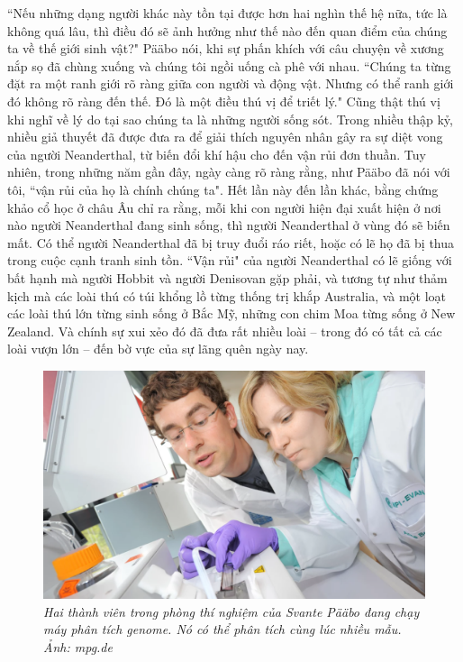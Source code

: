 \begin{multicols}{2}
	\vskip 0.1cm
	``Nếu những dạng người khác này tồn tại được hơn hai nghìn thế hệ nữa, tức là không quá lâu, thì điều đó sẽ ảnh hưởng như thế nào đến quan điểm của chúng ta về thế giới sinh vật?" Pääbo nói, khi sự phấn khích với câu chuyện về xương nắp sọ đã chùng xuống và chúng tôi ngồi uống cà phê với nhau. ``Chúng ta từng đặt ra một ranh giới rõ ràng giữa con người và động vật. Nhưng có thể ranh giới đó không rõ ràng đến thế. Đó là một điều thú vị để triết lý." Cũng thật thú vị khi nghĩ về lý do tại sao chúng ta là những người sống sót.
	\vskip 0.1cm
	Trong nhiều thập kỷ, nhiều giả thuyết đã được đưa ra để giải thích nguyên nhân gây ra sự diệt vong của người Neanderthal, từ biến đổi khí hậu cho đến vận rủi đơn thuần. Tuy nhiên, trong những năm gần đây, ngày càng rõ ràng rằng, như Pääbo đã nói với tôi, ``vận rủi của họ là chính chúng ta". Hết lần này đến lần khác, bằng chứng khảo cổ học ở châu Âu chỉ ra rằng, mỗi khi con người hiện đại xuất hiện ở nơi nào người Neanderthal đang sinh sống, thì người Neanderthal ở vùng đó sẽ biến mất. Có thể người Neanderthal đã bị truy đuổi ráo riết, hoặc có lẽ họ đã bị thua trong cuộc cạnh tranh sinh tồn. ``Vận rủi" của người Neanderthal có lẽ giống với bất hạnh mà người Hobbit và người Denisovan gặp phải, và tương tự như thảm kịch mà các loài thú có túi khổng lồ từng thống trị khắp Australia, và một loạt các loài thú lớn từng sinh sống ở Bắc Mỹ, những con chim Moa từng sống ở New Zealand. Và chính sự xui xẻo đó đã đưa rất nhiều loài -- trong đó có tất cả các loài vượn lớn -- đến bờ vực của sự lãng quên ngày nay.
	\begin{figure}[H]
		\vspace*{-5pt}
		\centering
		\captionsetup{labelformat= empty, justification=centering}
		\includegraphics[width= 1\linewidth]{7}
		\caption{\small\textit{\color{timhieukhoahoc}Hai thành viên trong phòng thí nghiệm của Svante Pääbo đang chạy máy phân tích genome. Nó có thể phân tích cùng lúc nhiều mẫu. Ảnh: mpg.de}}

\end{figure}
\end{multicols}
